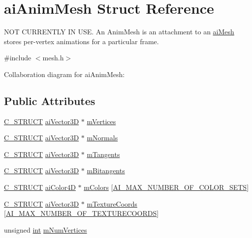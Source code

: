 \hypertarget{structai_anim_mesh}{\section{ai\-Anim\-Mesh Struct Reference}
\label{structai_anim_mesh}
}


N\-O\-T C\-U\-R\-R\-E\-N\-T\-L\-Y I\-N U\-S\-E. An Anim\-Mesh is an attachment to an \hyperlink{structai_mesh}{ai\-Mesh} stores per-\/vertex animations for a particular frame.  




{\ttfamily \#include $<$mesh.\-h$>$}



Collaboration diagram for ai\-Anim\-Mesh\-:
\subsection*{Public Attributes}
\begin{DoxyCompactItemize}
\item 
\hyperlink{defs_8h_ab51df4230ceb602bbc1bc109c432a6a0}{C\-\_\-\-S\-T\-R\-U\-C\-T} \hyperlink{structai_vector3_d}{ai\-Vector3\-D} $\ast$ \hyperlink{structai_anim_mesh_a0ac2dd4c1afd23e6a9293b1d0ded3060}{m\-Vertices}
\item 
\hyperlink{defs_8h_ab51df4230ceb602bbc1bc109c432a6a0}{C\-\_\-\-S\-T\-R\-U\-C\-T} \hyperlink{structai_vector3_d}{ai\-Vector3\-D} $\ast$ \hyperlink{structai_anim_mesh_a64a07a8c5c419b1e006c5302bca4d334}{m\-Normals}
\item 
\hyperlink{defs_8h_ab51df4230ceb602bbc1bc109c432a6a0}{C\-\_\-\-S\-T\-R\-U\-C\-T} \hyperlink{structai_vector3_d}{ai\-Vector3\-D} $\ast$ \hyperlink{structai_anim_mesh_a95dcc49c6d5ecc570ceb54552a0a9625}{m\-Tangents}
\item 
\hyperlink{defs_8h_ab51df4230ceb602bbc1bc109c432a6a0}{C\-\_\-\-S\-T\-R\-U\-C\-T} \hyperlink{structai_vector3_d}{ai\-Vector3\-D} $\ast$ \hyperlink{structai_anim_mesh_a7d60acf4d2b4b59dcc6c88956bfae85f}{m\-Bitangents}
\item 
\hyperlink{defs_8h_ab51df4230ceb602bbc1bc109c432a6a0}{C\-\_\-\-S\-T\-R\-U\-C\-T} \hyperlink{structai_color4_d}{ai\-Color4\-D} $\ast$ \hyperlink{structai_anim_mesh_a4f062d9fac71c6b367fdf0f8638e1ca5}{m\-Colors} \mbox{[}\hyperlink{mesh_8h_a74ea1282873ac4b111b48d2380c26bdc}{A\-I\-\_\-\-M\-A\-X\-\_\-\-N\-U\-M\-B\-E\-R\-\_\-\-O\-F\-\_\-\-C\-O\-L\-O\-R\-\_\-\-S\-E\-T\-S}\mbox{]}
\item 
\hyperlink{defs_8h_ab51df4230ceb602bbc1bc109c432a6a0}{C\-\_\-\-S\-T\-R\-U\-C\-T} \hyperlink{structai_vector3_d}{ai\-Vector3\-D} $\ast$ \hyperlink{structai_anim_mesh_ad24a0451adeb845a53eb2351b9462e0a}{m\-Texture\-Coords} \mbox{[}\hyperlink{mesh_8h_a335874c5058c7f1e866eb953bf192258}{A\-I\-\_\-\-M\-A\-X\-\_\-\-N\-U\-M\-B\-E\-R\-\_\-\-O\-F\-\_\-\-T\-E\-X\-T\-U\-R\-E\-C\-O\-O\-R\-D\-S}\mbox{]}
\item 
unsigned \hyperlink{_s_d_l__thread_8h_a6a64f9be4433e4de6e2f2f548cf3c08e}{int} \hyperlink{structai_anim_mesh_a6bb0d45317a1bbea7f2b7f8191d0c436}{m\-Num\-Vertices}
\end{DoxyCompactItemize}


